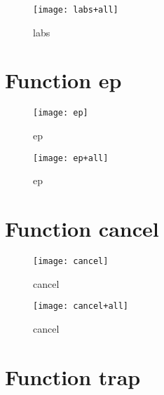\begin{center}
\begin{figure}[h]
\centering
\texttt{[image: labs+all]}
\caption{labs}
\end{figure}
\end{center}

\newpage

\section{Function ep}
\begin{center}

\end{center}

\begin{center}
\begin{figure}[h]
\centering
\texttt{[image: ep]}
\caption{ep}
\end{figure}
\end{center}

\begin{center}
\begin{figure}[h]
\centering
\texttt{[image: ep+all]}
\caption{ep}
\end{figure}
\end{center}

\newpage

\section{Function cancel}
\begin{center}

\end{center}

\begin{center}
\begin{figure}[h]
\centering
\texttt{[image: cancel]}
\caption{cancel}
\end{figure}
\end{center}

\begin{center}
\begin{figure}[h]
\centering
\texttt{[image: cancel+all]}
\caption{cancel}
\end{figure}
\end{center}

\newpage

\section{Function trap}
\begin{center}

\end{center}

